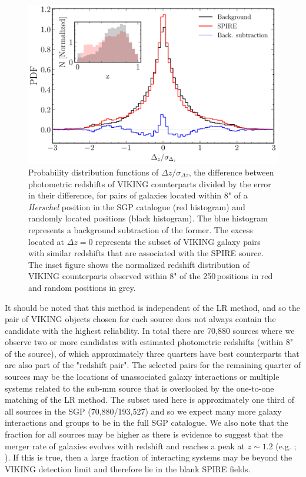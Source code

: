 \begin{figure}
    \centering
    \includegraphics[width=0.75\columnwidth]{Figures/delta_z_multiplicity.pdf}
    \caption{Probability distribution functions of $\Delta z/\sigma_{\Delta z}$, the difference between photometric redshifts of VIKING counterparts divided by the error in their difference, for pairs of galaxies located within 8" of a \textit{Herschel} position in the SGP catalogue (red histogram) and randomly located positions (black histogram). The blue histogram represents a background subtraction of the former. The excess located at $\Delta z = 0$ represents the subset of VIKING galaxy pairs with similar redshifts that are associated with the SPIRE source. The inset figure shows the normalized redshift distribution of VIKING counterparts observed within 8" of the 250\,\micron positions in red and random positions in grey.}
    \label{fig:delta_z_multiplicity}
\end{figure}

It should be noted that this method is independent of the LR method, and so the pair of VIKING objects chosen for each source does not always contain the candidate with the highest reliability. In total there are 70,880 sources where we observe two or more candidates with estimated photometric redshifts (within 8" of the source), of which approximately three quarters have best counterparts that are also part of the "redshift pair". The selected pairs for the remaining quarter of sources may be the locations of unassociated galaxy interactions or multiple systems related to the sub-mm source that is overlooked by the one-to-one matching of the LR method. The subset used here is approximately one third of all sources in the SGP (70,880/193,527) and so we expect many more galaxy interactions and groups to be in the full SGP catalogue. We also note that the fraction for all sources may be higher as there is evidence to suggest that the merger rate of galaxies evolves with redshift and reaches a peak at $z \sim 1.2$ (e.g. \citealt{Bell_2006}; \citealt{Ryan_2008}). If this is true, then a large fraction of interacting systems may be beyond the VIKING detection limit and therefore lie in the blank SPIRE fields.

